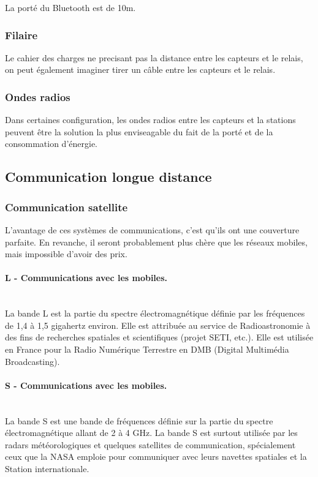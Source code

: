             La porté du Bluetooth est de 10m.
            
        \subsubsection{Filaire}
            Le cahier des charges ne precisant pas la distance entre les capteurs et le relais, on peut également imaginer tirer un câble entre les capteurs et le relais.
            
        \subsubsection{Ondes radios}
            Dans certaines configuration, les ondes radios entre les capteurs et la stations peuvent être la solution la plus enviseagable du fait de la porté et de la consommation d'énergie.
            

\subsection{Communication longue distance}

    \subsubsection{Communication satellite}

        L'avantage de ces systèmes de communications, c'est qu'ils ont une couverture parfaite.
        En revanche, il seront probablement plus chère que les réseaux mobiles, mais impossible d'avoir des prix.

        \paragraph{L - Communications avec les mobiles.}~\\
            La bande L est la partie du spectre électromagnétique définie par les fréquences de 1,4 à 1,5 gigahertz environ. Elle est attribuée au service de Radioastronomie à des fins de recherches spatiales et scientifiques (projet SETI, etc.). Elle est utilisée en France pour la Radio Numérique Terrestre en DMB (Digital Multimédia Broadcasting).

        \paragraph{S - Communications avec les mobiles.}~\\
            La bande S est une bande de fréquences définie sur la partie du spectre électromagnétique allant de 2 à 4 GHz.
            La bande S est surtout utilisée par les radars météorologiques et quelques satellites de communication, spécialement ceux que la NASA emploie pour communiquer avec leurs navettes spatiales et la Station internationale.

